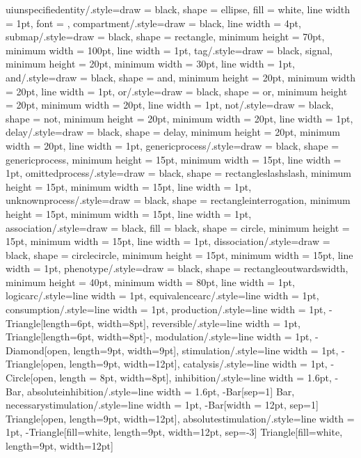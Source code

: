 {    uiunspecifiedentity/.style={draw = black, shape = ellipse, fill = white, line width = 1pt, font = {\tiny\sffamily}},
    compartment/.style={draw = black, line width = 4pt},
    submap/.style={draw = black, shape = rectangle, minimum height = 70pt, minimum width = 100pt, line width = 1pt},
    tag/.style={draw = black, signal, minimum height = 20pt, minimum width = 30pt, line width = 1pt},
    and/.style={draw = black, shape = and, minimum height = 20pt, minimum width = 20pt, line width = 1pt},
    or/.style={draw = black, shape = or, minimum height = 20pt, minimum width = 20pt, line width = 1pt},
    not/.style={draw = black, shape = not, minimum height = 20pt, minimum width = 20pt, line width = 1pt},
    delay/.style={draw = black, shape = delay, minimum height = 20pt, minimum width = 20pt, line width = 1pt},
    genericprocess/.style={draw = black, shape = genericprocess, minimum height = 15pt, minimum width = 15pt, line width = 1pt},
    omittedprocess/.style={draw = black, shape = rectangleslashslash, minimum height = 15pt, minimum width = 15pt, line width = 1pt},
    unknownprocess/.style={draw = black, shape = rectangleinterrogation, minimum height = 15pt, minimum width = 15pt, line width = 1pt},
    association/.style={draw = black, fill = black, shape = circle, minimum height = 15pt, minimum width = 15pt, line width = 1pt},
    dissociation/.style={draw = black, shape = circlecircle, minimum height = 15pt, minimum width = 15pt, line width = 1pt},
    phenotype/.style={draw = black, shape = rectangleoutwardswidth, minimum height = 40pt, minimum width = 80pt, line width = 1pt},
    logicarc/.style={line width = 1pt},
    equivalencearc/.style={line width = 1pt},
    consumption/.style={line width = 1pt},
    production/.style={line width = 1pt, -{Triangle[length=6pt, width=8pt]}},
    reversible/.style={line width = 1pt, {Triangle[length=6pt, width=8pt]}-},
    modulation/.style={line width = 1pt, -{Diamond[open, length=9pt, width=9pt]}},
    stimulation/.style={line width = 1pt, -{Triangle[open, length=9pt, width=12pt]}},
    catalysis/.style={line width = 1pt, -{Circle[open, length = 8pt, width=8pt]}},
    inhibition/.style={line width = 1.6pt, -{Bar}},
    absoluteinhibition/.style={line width = 1.6pt, -{Bar[sep=1] Bar}},
    necessarystimulation/.style={line width = 1pt, -{Bar[width = 12pt, sep=1] Triangle[open, length=9pt, width=12pt]}},
    absolutestimulation/.style={line width = 1pt, -{Triangle[fill=white, length=9pt, width=12pt, sep=-3] Triangle[fill=white, length=9pt, width=12pt]}}}
